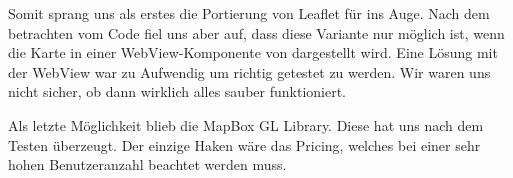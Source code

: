 Somit sprang uns als erstes die Portierung von Leaflet für  ins Auge. 
Nach dem betrachten vom Code fiel uns aber auf, dass diese Variante nur möglich ist, wenn die Karte in einer WebView-Komponente von  dargestellt wird.
Eine Lösung mit der WebView war zu Aufwendig um richtig getestet zu werden. 
Wir waren uns nicht sicher, ob dann wirklich alles sauber funktioniert.

Als letzte Möglichkeit blieb die MapBox GL Library.
Diese hat uns nach dem Testen überzeugt.
Der einzige Haken wäre das Pricing, welches bei einer sehr hohen Benutzeranzahl beachtet werden muss.
